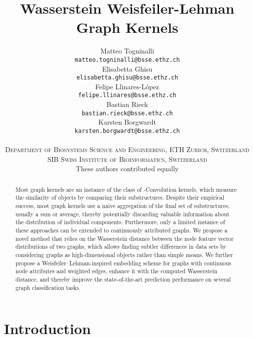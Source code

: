\documentclass{article}
\title{Wasserstein Weisfeiler-Lehman Graph Kernels}
\author{Matteo Togninalli \\
  \small\texttt{matteo.togninalli@bsse.ethz.ch} \\
  \And
  Elisabetta Ghisu \\
  \small\texttt{elisabetta.ghisu@bsse.ethz.ch} \\
  \And
  Felipe Llinares-L\'{o}pez \\
  \small\texttt{felipe.llinares@bsse.ethz.ch} \\
  \And
  Bastian Rieck\\
  \small\texttt{bastian.rieck@bsse.ethz.ch} \\
  \And
  Karsten Borgwardt \\
  \small\texttt{karsten.borgwardt@bsse.ethz.ch} \\\\
  \small\textsc{Department of Biosystems Science and Engineering, ETH Zurich, Switzerland}\\
    \small\textsc{SIB Swiss Institute of Bioinformatics, Switzerland}\\
    \small{These authors contributed equally}\\
}
\begin{document}
\maketitle




\begin{abstract}
Most graph kernels are an instance of the class of \mbox{-Convolution} kernels, which measure the similarity of objects by comparing their substructures.
Despite their empirical success, most graph kernels use a naive aggregation of the final set of substructures, usually a sum or average, thereby potentially discarding valuable information about the distribution of individual components. Furthermore, only a limited instance of these approaches can be extended to continuously attributed graphs. 
We propose a novel method that relies on the Wasserstein distance between the node feature vector distributions of two graphs, which allows finding subtler differences in data sets by considering graphs as high-dimensional objects  rather than simple means.
We further propose a Weisfeiler--Lehman-inspired embedding scheme for graphs with continuous node attributes and weighted edges, enhance it with the computed Wasserstein distance, and thereby improve the state-of-the-art prediction performance on several graph classification tasks.
\end{abstract}

\section{Introduction}
\label{introduction}
\end{document}
